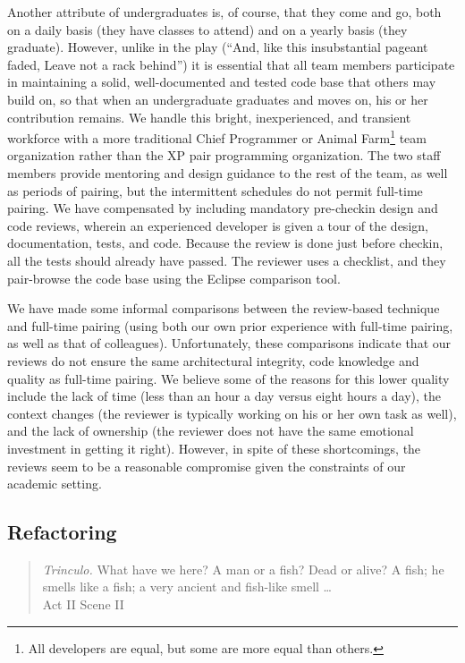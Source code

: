 \documentclass[times, 10pt,twocolumn]{article}
\begin{document}
Another attribute of undergraduates is, of course, that they come and go,
both on a daily basis (they have classes to attend) and on a yearly basis
(they graduate).
However, unlike in the play (``And, like this insubstantial pageant faded,
Leave not a rack behind'') it is essential that all team members
participate in maintaining a solid, well-documented and tested code base
that others may build on, so that when an undergraduate graduates and moves
on, his or her contribution remains.  
We handle this bright, inexperienced, and transient workforce with 
a more traditional Chief Programmer or Animal Farm\footnote{All developers are
equal, but some are more equal than others.} team organization rather than the
XP pair programming organization.  The two staff members provide
mentoring and design guidance to the rest of the team, as well as
periods of pairing, but the intermittent schedules do not permit
full-time pairing.  We have compensated by including mandatory 
pre-checkin design and code reviews, wherein an experienced developer 
is given a tour of the design, documentation, tests, and code.  Because
the review is done just before checkin,
all the tests should already have passed.
The reviewer uses a checklist, and they pair-browse the code base using the 
Eclipse comparison tool.

We have made some informal comparisons between the review-based technique
and full-time pairing (using both our own prior experience with full-time
pairing, as well as that of colleagues).  Unfortunately, these comparisons
indicate that our reviews do not ensure the same architectural integrity,
code knowledge and quality as full-time pairing.
We believe some of the reasons for this lower quality include the lack of time 
(less than an hour a day versus eight hours a day), the context changes 
(the reviewer is typically working on his or her own task as well), and 
the lack of ownership (the reviewer does not have the same emotional 
investment in getting it right).
However, in spite of these shortcomings, the reviews seem to be a
reasonable compromise given the constraints of our academic setting.

\subsection{Refactoring}

\begin{quote}
\emph{Trinculo.} What have we here?  A man or a fish?  Dead or alive?  A fish;
he smells like a fish; a very ancient and fish-like smell \ldots \\
\hspace*{1cm} Act II Scene II 
\end{quote}
\end{document}

